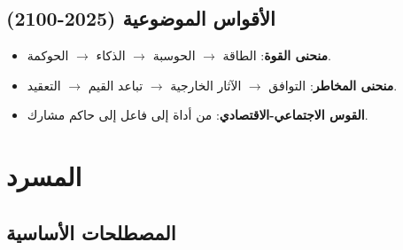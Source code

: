 \documentclass[11pt]{article}
\begin{document}
\subsection{الأقواس الموضوعية (2025-2100)}
\begin{itemize}[noitemsep]
  \item \textbf{منحنى القوة}: الطاقة $\rightarrow$ الحوسبة $\rightarrow$ الذكاء $\rightarrow$ الحوكمة.
  \item \textbf{منحنى المخاطر}: التوافق $\rightarrow$ الآثار الخارجية $\rightarrow$ تباعد القيم $\rightarrow$ التعقيد.
  \item \textbf{القوس الاجتماعي-الاقتصادي}: من أداة إلى فاعل إلى حاكم مشارك.
\end{itemize}

\clearpage

\section*{المسرد}

\subsection*{المصطلحات الأساسية}
\end{document}
